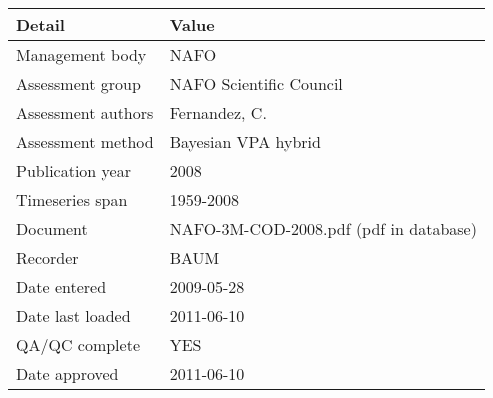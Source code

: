 \begin{table}[htb]
\centering
\begin{tabular}{ll}
\toprule
Detail & Value \\
\midrule
Management body    & NAFO                                   \\
Assessment group   & NAFO Scientific Council                \\
Assessment authors & Fernandez, C.                          \\
Assessment method  & Bayesian VPA hybrid                    \\
Publication year   & 2008                                   \\
Timeseries span    & 1959-2008                              \\
Document           & NAFO-3M-COD-2008.pdf (pdf in database) \\
Recorder           & BAUM                                   \\
Date entered       & 2009-05-28                             \\
Date last loaded   & 2011-06-10                             \\
QA/QC complete     & YES                                    \\
Date approved      & 2011-06-10                             \\
\bottomrule
\end{tabular}
\label{tab:assessdet}
\end{table}
